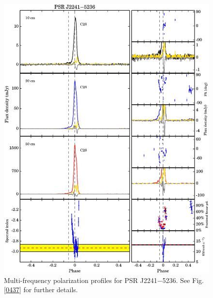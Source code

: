 \documentclass[useAMS,usenatbib]{mn2e}
\begin{document}
\begin{appendix}
\begin{figure}
\begin{center}
\includegraphics[width=6 in]{2241.ps}
\caption{Multi-frequency polarization profiles for PSR J2241$-$5236. 
See Fig. \ref{0437} for further details.}
\label{2241}
\end{center}
\end{figure}

\end{appendix}
\end{document}

